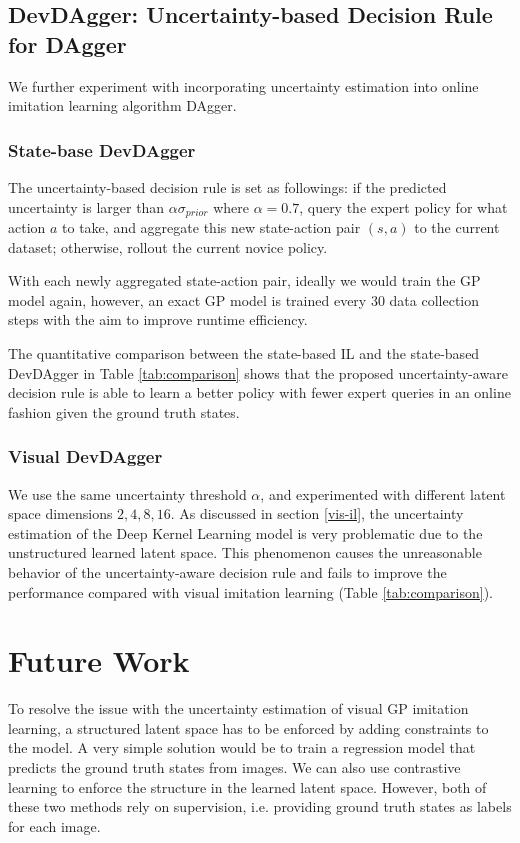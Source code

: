 \documentclass[11pt, reqno, letterpaper, twoside]{amsart}
\begin{document}
\subsection{DevDAgger: Uncertainty-based Decision Rule for DAgger}
We further experiment with incorporating uncertainty estimation into online imitation learning algorithm DAgger.

\subsubsection{State-base DevDAgger}
The uncertainty-based decision rule is set as followings: if the predicted uncertainty is larger than $\alpha \sigma_{prior}$ where $\alpha=0.7$, query the expert policy for what action $a$ to take, and aggregate this new state-action pair $(s, a)$ to the current dataset; otherwise, rollout the current novice policy.

With each newly aggregated state-action pair, ideally we would train the GP model again, however, an exact GP model is trained every $30$ data collection steps with the aim to improve runtime efficiency.

The quantitative comparison between the state-based IL and the state-based DevDAgger in Table \ref{tab:comparison} shows that the proposed uncertainty-aware decision rule is able to learn a better policy with fewer expert queries in an online fashion given the ground truth states.

\subsubsection{Visual DevDAgger}
We use the same uncertainty threshold $\alpha$, and experimented with different latent space dimensions $2, 4, 8, 16$.
As discussed in section \ref{vis-il}, the uncertainty estimation of the Deep Kernel Learning model is very problematic due to the unstructured learned latent space. This phenomenon causes the unreasonable behavior of the uncertainty-aware decision rule and fails to improve the performance compared with visual imitation learning (Table \ref{tab:comparison}).

\section{Future Work}
To resolve the issue with the uncertainty estimation of visual GP imitation learning, a structured latent space has to be enforced by adding constraints to the model. A very simple solution would be to train a regression model that predicts the ground truth states from images. We can also use contrastive learning to enforce the structure in the learned latent space. However, both of these two methods rely on supervision, i.e. providing ground truth states as labels for each image.
\end{document}

